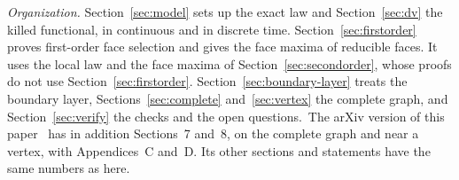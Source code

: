 \emph{Organization.} Section~\ref{sec:model} sets up the exact law and
Section~\ref{sec:dv} the killed functional, in continuous and in discrete time. Section~\ref{sec:firstorder} proves
first-order face selection and gives the face maxima of reducible faces. It uses the local law and the face maxima of
Section~\ref{sec:secondorder}, whose proofs do not use
Section~\ref{sec:firstorder}. Section~\ref{sec:boundary-layer} treats the
boundary layer, \ifarxivbuild Sections~\ref{sec:complete} and~\ref{sec:vertex} the complete
graph, \fi and Section~\ref{sec:verify} the checks and the open questions.\ifarxivbuild\else\ The
arXiv version of this paper~\cite{arxivC1} has in addition Sections~7 and~8, on the complete graph
and near a vertex, with Appendices~C and~D. Its other sections and statements have the same numbers
as here.\fi
